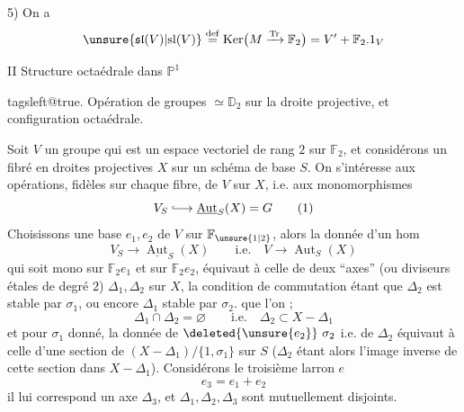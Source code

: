 5) On a
\[
\unsure{\mathfrak{sl}(V)|\mathrm{sl}(V)}
\overset{\mathrm{def}}{=}
\operatorname{Ker}\bigl(M\xrightarrow{\operatorname{Tr}}\mathbb F_2\bigr)
=V'+\mathbb F_2.1_V
\]

II \qquad Structure octaédrale dans \(\mathbb P^1\)

\begingroup\csname tagsleft@true. Opération de groupes \(\simeq\mathbb D_2\) sur la droite projective, et configuration octaédrale.

Soit \(V\) un groupe qui est un espace vectoriel de rang \(2\) sur \(\mathbb F_2\),  et considérons un fibré en droites projectives \(X\) sur un schéma de base \(S\). On s'intéresse aux opérations, fidèles sur chaque fibre, de \(V\) sur \(X\), i.e. aux monomorphismes
\[
V_S\lhook\joinrel\longrightarrow\underline{\operatorname{Aut}}_S(X)=G \tag*{(1)}
\]
Choisissons une base \(e_1,e_2\) de \(V\) sur \(\mathbb F_{\unsure{1|2}}\), alors la donnée d'un hom
\[
V_S\longrightarrow\underline{\operatorname{Aut}}_S(X)\qquad\text{i.e.}\quad V\longrightarrow\operatorname{Aut}_S(X)
\]
qui soit mono sur \(\mathbb F_2 e_1\) et sur \(\mathbb F_2 e_2\), équivaut à celle de  deux ``axes'' (ou diviseurs étales de degré \(2\)) \(\Delta_1,\Delta_2\) sur \(X\), la condition de commutation étant que \(\Delta_2\) est stable par \(\sigma_1\), ou  encore \(\Delta_1\) stable par \(\sigma_2\).
    que l'on ; 
\[
\Delta_1\cap\Delta_2=\varnothing\qquad\text{i.e.}\quad\Delta_2\subset X-\Delta_1 \tag*{(2)}
\]
et pour \(\sigma_1\)  donné, la donnée de \(\deleted{\unsure{e_2}}\ \sigma_2\) i.e. de \(\Delta_2\) équivaut à celle d'une section de  \((X-\Delta_1)/\{1,\sigma_1\}\) sur \(S\) (\(\Delta_2\) étant alors l'image inverse de cette section dans \(X-\Delta_1\)). Considérons le troisième larron \(e\)
\[
e_3=e_1+e_2 \tag*{(3)}
\]
il lui correspond un axe \(\Delta_3\), et \(\Delta_1,\Delta_2,\Delta_3\) sont mutuellement disjoints.
\endgroup

